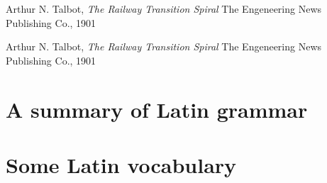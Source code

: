 \documentclass{ifacconf}
\begin{document}
\begin{thebibliography}{xx}

Arthur N. Talbot,
\newblock \emph{The Railway Transition Spiral}
\newblock The Engeneering News Publishing Co., 1901

Arthur N. Talbot, %
\newblock \emph{The Railway Transition Spiral} %
\newblock The Engeneering News Publishing Co., 1901 %

\end{thebibliography}








\appendix
\section{A summary of Latin grammar}    %
\section{Some Latin vocabulary}         %
\end{document}
